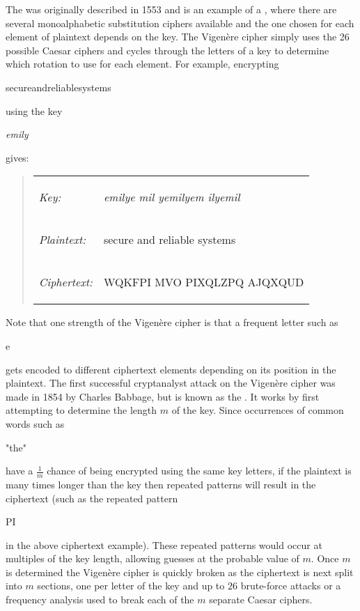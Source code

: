 The  was originally
described in 1553 and is an example of a ,
where there are several monoalphabetic substitution ciphers available and the one chosen
for each element of plaintext depends on the key.
The Vigen\`ere cipher simply uses the 26 possible Caesar ciphers and cycles through
the letters of a key to determine which rotation to use for each element.
For example, encrypting \begin{code}secureandreliablesystems\end{code}
using the key \begin{code}\emph{emily}\end{code} gives:
\begin{quote}\begin{tabular}{ll}
  \emph{Key:}       & \begin{code}\emph{emilye mil yemilyem ilyemil}\end{code} \\
  \emph{Plaintext:} & \begin{code}secure and reliable systems\end{code} \\
  \emph{Ciphertext:}& \begin{code}WQKFPI MVO PIXQLZPQ AJQXQUD\end{code}
\end{tabular}\end{quote}
Note that one strength of the Vigen\`ere cipher is that a frequent letter
such as \begin{code}e\end{code} gets encoded to different ciphertext elements
depending on its position in the plaintext.
The first successful cryptanalyst attack on the Vigen\`ere cipher
was made in 1854 by Charles Babbage, but is known as the .
It works by first attempting to determine the length $m$ of the key.
Since occurrences of common words such as \begin{code}"the"\end{code} have a $\frac{1}{m}$
chance of being encrypted using the same key letters,
if the plaintext is many times longer than the key then repeated patterns will
result in the ciphertext
(such as the repeated pattern \begin{code}PI\end{code} in the above ciphertext example).
These repeated patterns would occur at multiples of the key length, allowing
guesses at the probable value of $m$. Once $m$ is determined the Vigen\`ere cipher
is quickly broken as the ciphertext is next split into $m$ sections, one per letter
of the key and up to $26$ brute-force attacks or a frequency analysis used to break
each of the $m$ separate Caesar ciphers.

